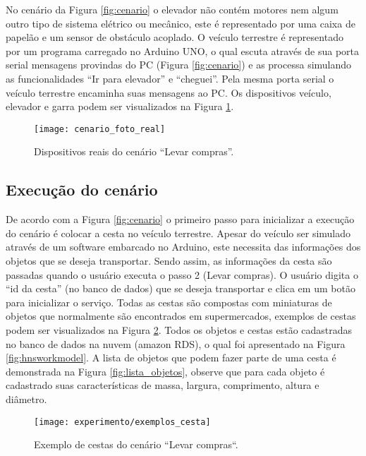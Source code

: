 No cenário da Figura \ref{fig:cenario} o elevador não contém motores nem algum outro tipo de sistema elétrico ou mecânico, este é representado por uma caixa de papelão e um sensor de obstáculo acoplado. O veículo terrestre é representado por um programa carregado no Arduino UNO\footnotemark {}, o qual escuta através de sua porta serial mensagens provindas do PC (Figura \ref{fig:cenario}) e as processa simulando as funcionalidades ``Ir para elevador'' e ``cheguei''. Pela mesma porta serial o veículo terrestre encaminha suas mensagens ao PC. Os dispositivos veículo, elevador e garra podem ser visualizados na Figura \ref{fig:cenario_real}.

\begin{figure}[!htb] \centering 
  \centering
  \texttt{[image: cenario\_foto\_real]} 
  \caption{Dispositivos reais do cenário ``Levar compras''.} 
  \label{fig:cenario_real}
\end{figure}

\subsection{Execução do cenário}
De acordo com a Figura \ref{fig:cenario} o primeiro passo para inicializar a execução do cenário é colocar a cesta no veículo terrestre. Apesar do veículo ser simulado através de um software embarcado no Arduino, este necessita das informações dos objetos que se deseja transportar. Sendo assim, as informações da cesta são passadas quando o usuário executa o passo 2 (Levar compras). O usuário digita o ``id da cesta'' (no banco de dados) que se deseja transportar e clica em um botão para inicializar o serviço. Todas as cestas são compostas com miniaturas de objetos que normalmente são encontrados em supermercados, exemplos de cestas podem ser visualizados na Figura \ref{fig:exemplos_cesta}. Todos os objetos e cestas estão cadastradas no banco de dados na nuvem (amazon RDS\footnotemark {}), o qual foi apresentado na Figura \ref{fig:hnsworkmodel}. A lista de objetos que podem fazer parte de uma cesta é demonstrada na Figura \ref{fig:lista_objetos}, observe que para cada objeto é cadastrado suas características de massa, largura, comprimento, altura e diâmetro.

\begin{figure}[!htb] \centering 
  \centering
  \texttt{[image: experimento/exemplos\_cesta]} 
  \caption{Exemplo de cestas do cenário ``Levar compras``.} 
  \label{fig:exemplos_cesta}
\end{figure}

